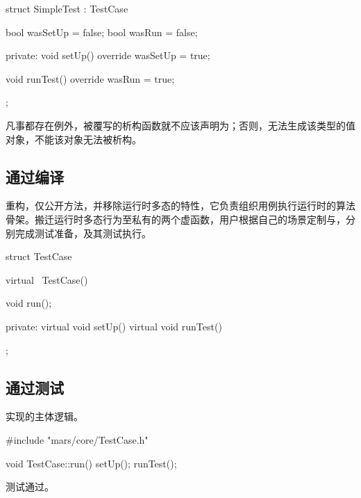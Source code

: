 \begin{content}
\begin{story}
\begin{content}
\begin{leftbar}
 \begin{c++}[caption={\ttfamily{test/mars/core/TestCaseSpec.cc}}]
struct SimpleTest : TestCase {
  bool wasSetUp = false;
  bool wasRun = false;

private:
  void setUp() override {
    wasSetUp = true;
  }

  void runTest() override {
    wasRun = true;
  }
};
 \end{c++}
\end{leftbar}

凡事都存在例外，被覆写的析构函数就不应该声明为；否则，无法生成该类型的值对象，不能该对象无法被析构。

\end{content}

\end{story}

\subsection{通过编译}

重构，仅公开方法，并移除运行时多态的特性，它负责组织用例执行运行时的算法骨架。搬迁运行时多态行为至私有的两个虚函数，用户根据自己的场景定制与，分别完成测试准备，及其测试执行。

\begin{leftbar}
 \begin{c++}[caption={\ttfamily{include/mars/core/TestCase.h}}]
struct TestCase {
  virtual ~TestCase() {}

  void run();

private:
  virtual void setUp() {}
  virtual void runTest() {}
};
  \end{c++}
\end{leftbar}

\subsection{通过测试}

实现的主体逻辑。

\begin{leftbar}
 \begin{c++}[caption={\ttfamily{src/mars/core/TestCase.cc}}]
#include "mars/core/TestCase.h"

void TestCase::run() {
  setUp();
  runTest();
}
 \end{c++}
\end{leftbar}

测试通过。

\end{content}

